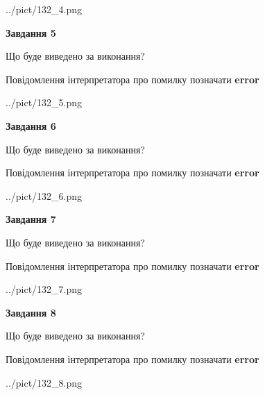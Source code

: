 \documentclass[12pt, ukrainian]{article}
\begin{document}
{\begin{center}
	{../pict/132_4.png}
\end{center}
\newpage

{\begin {center}\textbf{Завдання 5}\end {center}}\par
Що буде виведено за виконання? \par
Повідомлення інтерпретатора про помилку позначати \textbf{error}

\begin{center}
	{../pict/132_5.png}
\end{center}
\newpage

{\begin {center}\textbf{Завдання 6}\end {center}}\par
Що буде виведено за виконання? \par
Повідомлення інтерпретатора про помилку позначати \textbf{error}

\begin{center}
	{../pict/132_6.png}
\end{center}
\newpage

{\begin {center}\textbf{Завдання 7}\end {center}}\par
Що буде виведено за виконання? \par
Повідомлення інтерпретатора про помилку позначати \textbf{error}

\begin{center}
	{../pict/132_7.png}
\end{center}
\newpage

{\begin {center}\textbf{Завдання 8}\end {center}}\par
Що буде виведено за виконання? \par
Повідомлення інтерпретатора про помилку позначати \textbf{error}

\begin{center}
	{../pict/132_8.png}
\end{center}
\newpage

}
\end{document}
